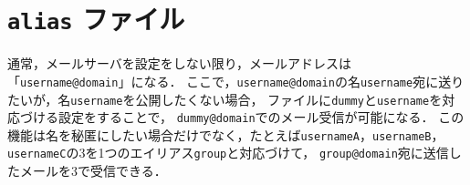 \section{\texttt{\bfseries alias} ファイル}
通常，メールサーバを設定をしない限り，メールアドレスは「\texttt{username@domain}」になる．
ここで，\texttt{username@domain}の名\texttt{username}宛に送りたいが，\user 名\texttt{username}を公開したくない場合，
\alias ファイルに\texttt{dummy}と\texttt{username}を対応づける設定をすることで，
\texttt{dummy@domain}でのメール受信が可能になる．
この機能は\user 名を秘匿にしたい場合だけでなく，たとえば\texttt{usernameA}，\texttt{usernameB}，\texttt{usernameC}の3\user を1つのエイリアス\texttt{group}と対応づけて，
\texttt{group@domain}宛に送信したメールを3\user で受信できる．
